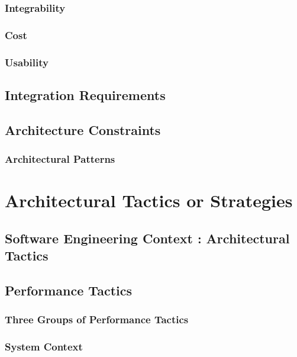 \documentclass[11pt,fleqn]{book} %
\begin{document}
	\subsection{Integrability}
	\subsection{Cost}
	\subsection{Usability}
	
	\section{Integration Requirements}
	
	\section{Architecture Constraints}
	\subsection{Architectural Patterns}
	
	
	
	\chapter{Architectural Tactics or Strategies}
	
	\section{Software Engineering Context : Architectural Tactics}
	\section{Performance Tactics}
	\subsection{Three Groups of Performance Tactics}
	\subsection{System Context}
\end{document}
